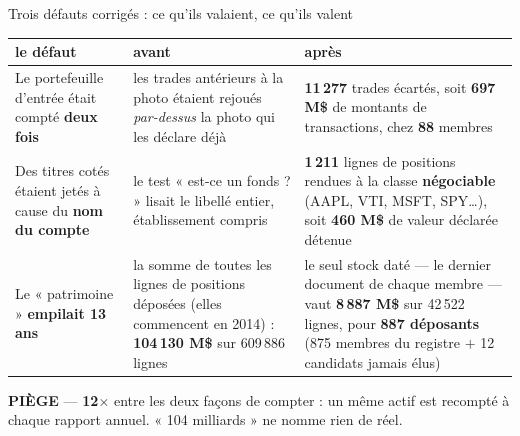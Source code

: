 \documentclass[11pt,aspectratio=169]{beamer}
\newcommand{\defl}[1]{{\scriptsize\color{black!55}#1}}
\newcommand{\piege}[1]{%
  \colorbox{warnorange!12}{\parbox{\dimexpr\linewidth-8pt}{\scriptsize
    \textbf{\textcolor{warnorange}{PIÈGE}}\; --- #1}}}
\begin{document}
\begin{frame}{Trois défauts corrigés : ce qu'ils valaient, ce qu'ils valent}
  \vspace{0pt}
  {\scriptsize
  \begin{tabular}{@{}>{\raggedright\arraybackslash}p{}>{\raggedright\arraybackslash}p{}>{\raggedright\arraybackslash}p{}@{}}
    \toprule
    \textbf{le défaut} & \textbf{avant} & \textbf{après}\\
    \midrule
    Le portefeuille d'entrée était compté \textbf{deux fois}
      & les trades antérieurs à la photo étaient rejoués \emph{par-dessus} la photo qui les
        déclare déjà
      & \textbf{11\,277} trades écartés, soit \textbf{697 M\$} de montants de transactions,
        chez \textbf{88} membres\\
    \addlinespace[0.6mm]
    Des titres cotés étaient jetés à cause du \textbf{nom du compte}
      & le test « est-ce un fonds ? » lisait le libellé entier, établissement compris
      & \textbf{1\,211} lignes de positions rendues à la classe \textbf{négociable}
        (AAPL, VTI, MSFT, SPY\ldots), soit \textbf{460 M\$} de valeur déclarée détenue\\
    \addlinespace[0.6mm]
    Le « patrimoine » \textbf{empilait 13 ans}
      & la somme de toutes les lignes de positions déposées \defl{(elles commencent en 2014)} :
        \textbf{104\,130 M\$} sur 609\,886 lignes
      & le seul stock daté --- le dernier document de chaque membre --- vaut
        \textbf{8\,887 M\$} sur 42\,522 lignes, pour \textbf{887 déposants}
        \defl{(875 membres du registre $+$ 12 candidats jamais élus)}\\
    \bottomrule
  \end{tabular}}\par\vspace{2.5mm}
  \piege{\textbf{12$\times$} entre les deux façons de compter : un même actif est recompté à chaque
  rapport annuel. « 104 milliards » ne nomme rien de réel.}
\end{frame}



\end{document}
